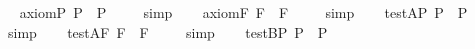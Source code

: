 \begin{isabellebody}
\isanewline
\isanewline
\ \isamarkupfalse%
\ axiom{\isacharunderscore}{}{\isacharunderscore}P{\isacharcolon}\ {\isachardoublequoteopen}{\isacharbrackleft}\isactrlbold {\isasymdiamond}{\isasymphi}\isactrlsup P\ \isactrlbold {\isasymrightarrow}\ \isactrlbold {\isasymbox}\isactrlbold {\isasymdiamond}{\isasymphi}\isactrlsup P{\isacharbrackright}\ {\isacharequal}\ {\isasymtop}{\isachardoublequoteclose}%
\isadelimproof
\ %
\endisadelimproof
%
\isatagproof
{}\isamarkupfalse%
\ simp\ \isamarkupfalse%
%
\endisatagproof
{\isafoldproof}%
%
\isadelimproof
%
\endisadelimproof
\isanewline
\ \isamarkupfalse%
\ axiom{\isacharunderscore}{}{\isacharunderscore}F{\isacharcolon}\ {\isachardoublequoteopen}{\isacharbrackleft}\isactrlbold {\isasymdiamond}{\isasymphi}\isactrlsup F\ \isactrlbold {\isasymrightarrow}\ \isactrlbold {\isasymbox}\isactrlbold {\isasymdiamond}{\isasymphi}\isactrlsup F{\isacharbrackright}\ {\isacharequal}\ {\isasymtop}{\isachardoublequoteclose}%
\isadelimproof
\ %
\endisadelimproof
%
\isatagproof
{}\isamarkupfalse%
\ simp\ \isamarkupfalse%
%
\endisatagproof
{\isafoldproof}%
%
\isadelimproof
%
\endisadelimproof
\isanewline
\isanewline
\ \isamarkupfalse%
\ test{\isacharunderscore}A{\isacharunderscore}P{\isacharcolon}\ {\isachardoublequoteopen}{\isacharbrackleft}\isactrlbold {\isasymbox}\isactrlbold {\isasymdiamond}{\isasymphi}\isactrlsup P\ \isactrlbold {\isasymrightarrow}\ \isactrlbold {\isasymdiamond}{\isasymphi}\isactrlsup P{\isacharbrackright}\ {\isacharequal}\ {\isasymtop}{\isachardoublequoteclose}%
\isadelimproof
\ %
\endisadelimproof
%
\isatagproof
{}\isamarkupfalse%
\ simp\ \isamarkupfalse%
%
\endisatagproof
{\isafoldproof}%
%
\isadelimproof
%
\endisadelimproof
\isanewline
\ \isamarkupfalse%
\ test{\isacharunderscore}A{\isacharunderscore}F{\isacharcolon}\ {\isachardoublequoteopen}{\isacharbrackleft}\isactrlbold {\isasymbox}\isactrlbold {\isasymdiamond}{\isasymphi}\isactrlsup F\ \isactrlbold {\isasymrightarrow}\ \isactrlbold {\isasymdiamond}{\isasymphi}\isactrlsup F{\isacharbrackright}\ {\isacharequal}\ {\isasymtop}{\isachardoublequoteclose}%
\isadelimproof
\ %
\endisadelimproof
%
\isatagproof
{}\isamarkupfalse%
\ simp\ \isamarkupfalse%
%
\endisatagproof
{\isafoldproof}%
%
\isadelimproof
%
\endisadelimproof
\isanewline
\isanewline
\ \isamarkupfalse%
\ test{\isacharunderscore}B{\isacharunderscore}P{\isacharcolon}\ {\isachardoublequoteopen}{\isacharbrackleft}\isactrlbold {\isasymdiamond}\isactrlbold {\isasymbox}{\isasymphi}\isactrlsup P\ \isactrlbold {\isasymrightarrow}\ \isactrlbold {\isasymdiamond}{\isasymphi}\isactrlsup P{\isacharbrackright}\ {\isacharequal}\ {\isasymtop}{\isachardoublequoteclose}%

\end{isabellebody}
